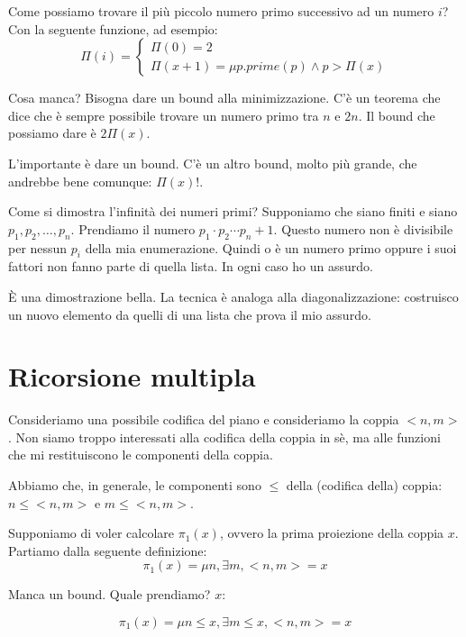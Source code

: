 Come possiamo trovare il più piccolo numero primo successivo ad un numero $i$? Con la seguente
funzione, ad esempio:
\begin{equation*}
    \Pi(i) = 
    \begin{cases}
        \Pi(0) = 2 \\
        \Pi(x + 1) = \mu p. \textit{prime}(p) \land p > \Pi(x)
    \end{cases}
\end{equation*}

Cosa manca? Bisogna dare un bound alla minimizzazione. C'è un teorema che dice che è sempre
possibile trovare un numero primo tra $n$ e $2n$. Il bound che possiamo dare è $2\Pi(x)$.

L'importante è dare un bound. C'è un altro bound, molto più grande, che andrebbe bene comunque:
$\Pi(x)!$.

Come si dimostra l'infinità dei numeri primi? Supponiamo che siano finiti e siano $p_{1}, p_{2},
\dotsc, p_{n}$. Prendiamo il numero $p_{1}\cdot p_{2}\cdots p_{n} + 1$. Questo numero non è
divisibile per nessun $p_{i}$ della mia enumerazione. Quindi o è un numero primo oppure i suoi
fattori non fanno parte di quella lista. In ogni caso ho un assurdo.

È una dimostrazione bella. La tecnica è analoga alla diagonalizzazione: costruisco un nuovo
elemento da quelli di una lista che prova il mio assurdo.

\section{Ricorsione multipla}

Consideriamo una possibile codifica del piano e consideriamo la coppia $<n,m>$. Non siamo troppo
interessati alla codifica della coppia in sè, ma alle funzioni che mi restituiscono le componenti
della coppia.

Abbiamo che, in generale, le componenti sono $\leq$ della (codifica della) coppia: $n \leq <n,m>$ e
$m \leq <n,m>$.

Supponiamo di voler calcolare $\pi_{1}(x)$, ovvero la prima proiezione della coppia $x$. Partiamo
dalla seguente definizione:
\begin{equation*}
    \pi_{1}(x) = \mu n, \exists m, <n,m> = x
\end{equation*}

Manca un bound. Quale prendiamo? $x$:

\begin{equation*}
    \pi_{1}(x) = \mu n \leq x, \exists m \leq x, <n,m> = x
\end{equation*}

